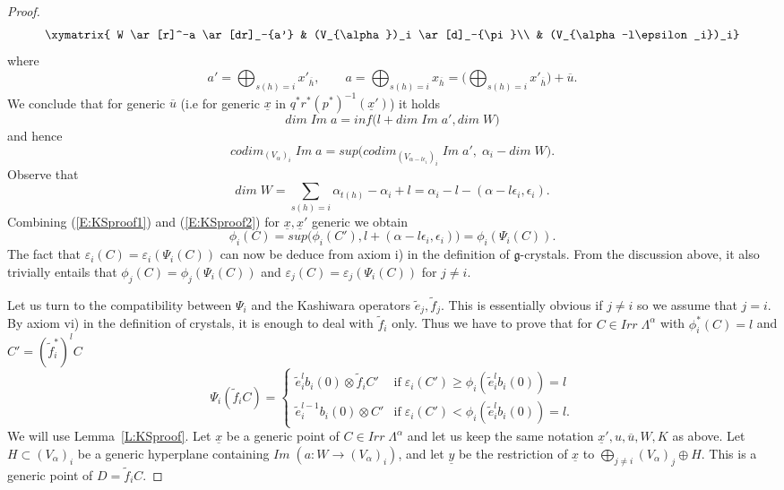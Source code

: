 \documentclass[a4paper,10pt]{amsart}
\def\a{\alpha}
\def\g{\mathfrak{g}}
\numberwithin{equation}{section}
\begin{document}
\begin{proof}
$$\xymatrix{
W \ar[r]^-a \ar[dr]_-{a'} & (V_{\a})_i \ar[d]_-{\pi}\\ & (V_{\a-l\epsilon_i})_i}$$
where
$$a'=\bigoplus_{s(h)=i} x'_{\overline{h}}, \qquad a=\bigoplus_{s(h)=i} x_{\overline{h}}= \big( \bigoplus_{s(h)=i} x'_{\overline{h}} \big) + \overline{u}.$$
We conclude that for generic $\overline{u}$ (i.e for generic $\underline{x}$ in $q^*r^*(p^*)^{-1} (\underline{x}')$) it holds
$$dim\;Im\;a=inf\big( l + dim\;Im\; a', dim\;W)$$
and hence
\begin{equation}\label{E:KSproof1}
codim_{(V_{\a})_i}\;Im\;a= sup \big( codim_{(V_{\a-l\epsilon_i})_i} \;Im\;a', \;\a_i-dim\;W).
\end{equation}
Observe that
\begin{equation}\label{E:KSproof2}
dim\;W =\sum_{s(h)=i} \a_{t(h)} -\a_i +l=\a_i-l - (\a-l\epsilon_i, \epsilon_i).
\end{equation}
Combining (\ref{E:KSproof1}) and (\ref{E:KSproof2}) for $\underline{x}, \underline{x}'$ generic we obtain
\begin{equation}\label{E:KSproof3}
\phi_i(C)= sup \big( \phi_i(C'), l+(\a-l\epsilon_i, \epsilon_i) \big)= \phi_i(\Psi_i(C)).
\end{equation}
The fact that $\varepsilon_i(C)=\varepsilon_i(\Psi_i(C))$ can now be deduce from axiom i) in the definition of $\g$-crystals. From the discussion above, it also trivially entails that $\phi_j(C)=\phi_j(\Psi_i(C))$ and $\varepsilon_j(C)=\varepsilon_j(\Psi_i(C))$ for $j \neq i$.

\vspace{.1in}

Let us turn to the compatibility between $\Psi_i$ and the Kashiwara operators $\tilde{e}_j, \tilde{f}_j$. This is essentially obvious if $j \neq i$ so we assume that $j=i$. By axiom vi) in the definition of crystals, it is enough to deal with $\tilde{f}_i$ only. Thus we have to prove that for $C \in Irr\;\Lambda^{\a}$ with $\phi^*_i(C)=l$ and $C'= (\tilde{f}_i^*)^lC$
\begin{equation}\label{E:KSSproof4}
\Psi_i(\tilde{f}_iC)=\begin{cases} \tilde{e}_i^l b_i(0) \otimes \tilde{f}_iC' & \text{if}\; \varepsilon_i(C') \geq \phi_i(\tilde{e}_i^l b_i(0))=l\\
 \tilde{e}_i^{l-1} b_i(0) \otimes C' & \text{if}\; \varepsilon_i(C') < \phi_i(\tilde{e}_i^l b_i(0))=l.
 \end{cases}
\end{equation}
We will use Lemma~\ref{L:KSproof}. Let $\underline{x}$ be a generic point of $C \in Irr\;\Lambda^{\a}$ and let us keep the same notation $\underline{x}', u, \overline{u}, W, K$ as above. Let $H \subset (V_{\a})_i$ be a generic hyperplane containing $Im\;(a : W \to (V_{\a})_i)$, and let $\underline{y}$ be the restriction of $\underline{x}$ to $\bigoplus_{j\neq i} (V_{\a})_j \oplus H$. This is a generic point of $D=\tilde{f}_iC$.


\end{proof}
\end{document}
